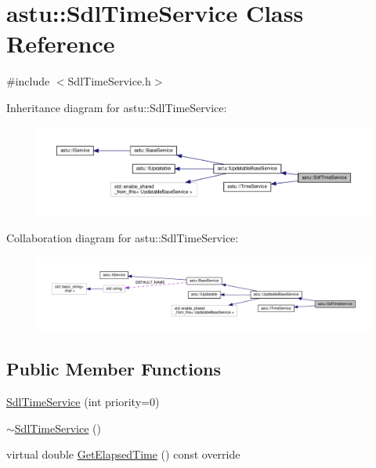 \hypertarget{classastu_1_1SdlTimeService}{}\section{astu\+:\+:Sdl\+Time\+Service Class Reference}
\label{classastu_1_1SdlTimeService}


{\ttfamily \#include $<$Sdl\+Time\+Service.\+h$>$}



Inheritance diagram for astu\+:\+:Sdl\+Time\+Service\+:\nopagebreak
\begin{figure}[H]
\begin{center}
\leavevmode
\includegraphics[width=350pt]{classastu_1_1SdlTimeService__inherit__graph}
\end{center}
\end{figure}


Collaboration diagram for astu\+:\+:Sdl\+Time\+Service\+:\nopagebreak
\begin{figure}[H]
\begin{center}
\leavevmode
\includegraphics[width=350pt]{classastu_1_1SdlTimeService__coll__graph}
\end{center}
\end{figure}
\subsection*{Public Member Functions}
\begin{DoxyCompactItemize}
\item 
\hyperlink{classastu_1_1SdlTimeService_a66fa9afe98778d34ab4f2a92ba6ded40}{Sdl\+Time\+Service} (int priority=0)
\item 
\hyperlink{classastu_1_1SdlTimeService_a2e7171a77afc5bf3a051eba2b583ea8a}{$\sim$\+Sdl\+Time\+Service} ()
\item 
virtual double \hyperlink{classastu_1_1SdlTimeService_a6652d19cae14e20ec85a1808fc8e87b7}{Get\+Elapsed\+Time} () const override
\end{DoxyCompactItemize}
